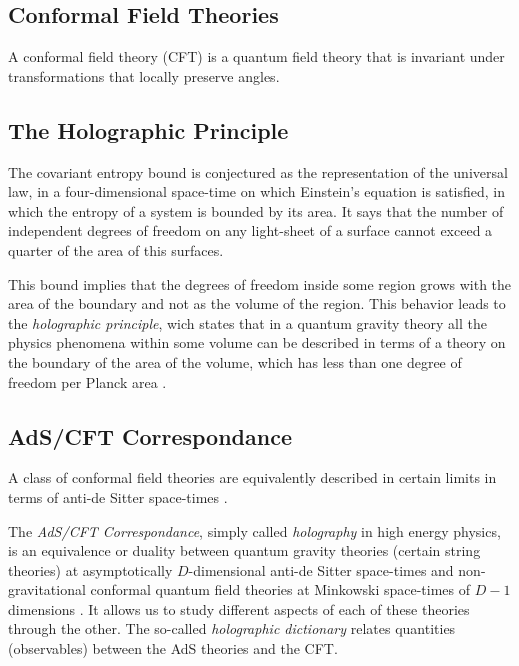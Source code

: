 \documentclass[lettersize,journal]{IEEEtran}
\begin{document}
\subsection{Conformal Field Theories} \label{ss:CFT}

A conformal field theory (CFT) is a quantum field theory that is invariant under transformations that locally preserve angles.


\subsection{The Holographic Principle} \label{ss:Holography}

The covariant entropy bound \cite{bousso_covariant_1999} is conjectured as the representation of the universal law, in a four-dimensional space-time on which Einstein’s equation is satisfied, in which the entropy of a system is bounded by its area. It says that the number of independent degrees of freedom on any light-sheet of a surface cannot exceed a quarter of the area of this surfaces.

This bound implies that the degrees of freedom inside some region grows with the area of the boundary and not as the volume of the region. This behavior leads to the \textit{holographic principle}, wich states that in a quantum gravity theory all the physics phenomena within some volume can be described in terms of a theory on the boundary of the area of the volume, which has less than one degree of freedom per Planck area \cite{t_hooft_dimensional_2009}.


\subsection{AdS/CFT Correspondance} \label{ss:AdS/CFT}

A class of conformal field theories are equivalently described in certain limits in terms of anti-de Sitter space-times \cite{rangamani_holographic_2017}.

The \textit{AdS/CFT Correspondance}, simply called \textit{holography} in high energy physics, is an equivalence or duality between quantum gravity theories (certain string theories) at asymptotically $D$-dimensional anti-de Sitter space-times and non-gravitational conformal quantum field theories at Minkowski space-times of $D-1$ dimensions \cite{maldacena_large_1999}. It allows us to study different aspects of each of these theories through the other. The so-called \textit{holographic dictionary} relates quantities (observables) between the AdS theories and the CFT. %
\end{document}
